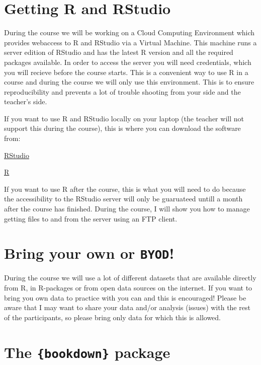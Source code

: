 \documentclass[]{book}
\begin{document}
\hypertarget{getting-r-and-rstudio}{%
\section{Getting R and RStudio}\label{getting-r-and-rstudio}}

During the course we will be working on a Cloud Computing Environment which provides webaccess to R and RStudio via a Virtual Machine. This machine runs a server edition of RStudio and has the latest R version and all the required packages available. In order to access the server you will need credentials, which you will recieve before the course starts. This is a convenient way to use R in a course and during the course we will only use this environment. This is to ensure reproducibility and prevents a lot of trouble shooting from your side and the teacher's side.

If you want to use R and RStudio locally on your laptop (the teacher will not support this during the course), this is where you can download the software from:

\href{https://www.rstudio.com/products/rstudio/download/}{RStudio}

\href{https://cran.r-project.org/}{R}

If you want to use R after the course, this is what you will need to do because the accessibility to the RStudio server will only be guaruateed untill a month after the course has finished. During the course, I will show you how to manage getting files to and from the server using an FTP client.

\hypertarget{bring-your-own-or-byod}{%
\section{\texorpdfstring{Bring your own or \texttt{BYOD}!}{Bring your own or BYOD!}}\label{bring-your-own-or-byod}}

During the course we will use a lot of different datasets that are available directly from R, in R-packages or from open data sources on the internet. If you want to bring you own data to practice with you can and this is encouraged! Please be aware that I may want to share your data and/or analysis (issues) with the rest of the participants, so please bring only data for which this is allowed.

\hypertarget{the-bookdown-package}{%
\section{\texorpdfstring{The \texttt{\{bookdown\}} package}{The \{bookdown\} package}}\label{the-bookdown-package}}
\end{document}
